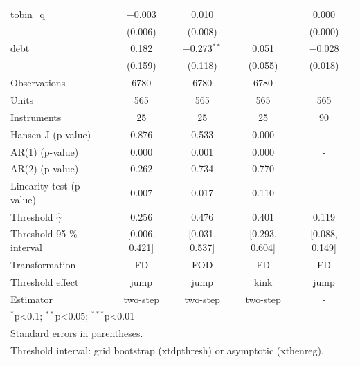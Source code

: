 \begin{table}[!htbp]
\begin{tabular}{lcccc}
tobin\_q & $-$0.003 & 0.010 &  & 0.000 \\
 & (0.006) & (0.008) &  & (0.000) \\
debt & 0.182 & $-$0.273$^{**}$ & 0.051 & $-$0.028 \\
 & (0.159) & (0.118) & (0.055) & (0.018) \\
\midrule
Observations & 6780 & 6780 & 6780 & - \\
Units & 565 & 565 & 565 & 565 \\
Instruments & 25 & 25 & 25 & 90 \\
Hansen J (p-value) & 0.876 & 0.533 & 0.000 & - \\
AR(1) (p-value) & 0.000 & 0.001 & 0.000 & - \\
AR(2) (p-value) & 0.262 & 0.734 & 0.770 & - \\
Linearity test (p-value) & 0.007 & 0.017 & 0.110 & - \\
Threshold $\hat{\gamma}$ & 0.256 & 0.476 & 0.401 & 0.119 \\
Threshold 95 \% interval & [0.006, 0.421] & [0.031, 0.537] & [0.293, 0.604] & [0.088, 0.149] \\
Transformation & FD & FOD & FD & FD \\
Threshold effect & jump & jump & kink & jump \\
Estimator & two-step & two-step & two-step & - \\
\bottomrule
\multicolumn{5}{l}{\footnotesize $^{*}$p\textless{}0.1; $^{**}$p\textless{}0.05; $^{***}$p\textless{}0.01} \\
\multicolumn{5}{l}{\footnotesize Standard errors in parentheses.} \\
\multicolumn{5}{l}{\footnotesize Threshold interval: grid bootstrap (xtdpthresh) or asymptotic (xthenreg).} \\
\end{tabular}
\end{table}
